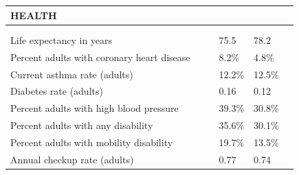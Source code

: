\documentclass[9pt]{report}
\begin{document}
\newpage
\setlength{\tabcolsep}{.01in} %
\begin{tabular}{p{.10in}p{.10in}p{.10in}p{3.7in}>{\hfill}p{.85in}>{\hfill}p{.85in}>{\hfill}p{.85in}>{\hfill}p{.85in}p{0.1in}}
\multicolumn{9}{l}{\parbox{7.1in}{\raggedright{\large{\strut\textbf{HEALTH}\strut}}}} \\ 
\hline
\multicolumn{4}{l}{\parbox{3.5in}{\raggedright{\textbf{}}}} & \multicolumn{1}{r}{\parbox{.85in}{\strut\raggedleft{\textbf{}\strut}}} & \multicolumn{1}{r}{\parbox{.85in}{\strut\raggedleft{\textbf{}\strut}}} & \multicolumn{1}{r}{\parbox{.85in}{\strut{}}} & \multicolumn{1}{r}{\parbox{.85in}{\strut{}}} & \\ 
\multicolumn{9}{l}{} \\ 
\multicolumn{4}{l}{\parbox{3.6in}{\strut\raggedright{{Life expectancy in years}}\strut}} &  &  & 75.5 & 78.2 & \multicolumn{1}{l}{}  \\ 
\multicolumn{4}{l}{\parbox{3.6in}{\strut\raggedright{{Percent adults with coronary heart disease}}\strut}} &  &  & 8.2\% & 4.8\% & \multicolumn{1}{l}{}  \\ 
\multicolumn{4}{l}{\parbox{3.6in}{\strut\raggedright{{Current asthma rate (adults)}}\strut}} &  &  & 12.2\% & 12.5\% & \multicolumn{1}{l}{}  \\ 
\multicolumn{4}{l}{\parbox{3.6in}{\strut\raggedright{{Diabetes rate (adults)}}\strut}} &  &  & 0.16 & 0.12 & \multicolumn{1}{l}{}  \\ 
\multicolumn{4}{l}{\parbox{3.6in}{\strut\raggedright{{Percent adults with high blood pressure}}\strut}} &  &  & 39.3\% & 30.8\% & \multicolumn{1}{l}{}  \\ 
\multicolumn{4}{l}{\parbox{3.6in}{\strut\raggedright{{Percent adults with any disability}}\strut}} &  &  & 35.6\% & 30.1\% & \multicolumn{1}{l}{}  \\ 
\multicolumn{4}{l}{\parbox{3.6in}{\strut\raggedright{{Percent adults with mobility disability}}\strut}} &  &  & 19.7\% & 13.5\% & \multicolumn{1}{l}{}  \\ 
\multicolumn{4}{l}{\parbox{3.6in}{\strut\raggedright{{Annual checkup rate (adults)}}\strut}} &  &  & 0.77 & 0.74 & \multicolumn{1}{l}{}  \\ 

\end{tabular}
\end{document}
